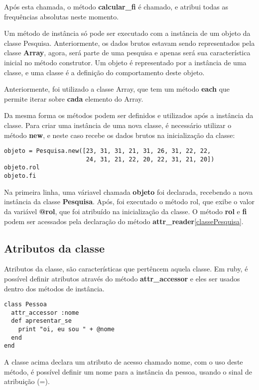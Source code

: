 \documentclass[12pt]{article}
\newcommand{\code}[1] {\textbf{#1}}
\begin{document}
Após esta chamada, o método \code{calcular\_fi} é chamado, e atribui todas as frequências absolutas neste momento. 

Um método de instância só pode ser executado com a instância de um objeto da classe Pesquisa. Anteriormente, os dados brutos estavam sendo representados pela classe \code{Array}, agora, será parte de uma pesquisa e apenas será sua característica inicial no método construtor. Um objeto é representado por a instância de uma classe, e uma classe é a definição do comportamento deste objeto.

Anteriormente, foi utilizado a classe Array, que tem um método \code{each} que permite iterar sobre \code{cada} elemento do Array. 

Da mesma forma os métodos podem ser definidos e utilizados após a instância da classe. Para criar uma instância de uma nova classe, é necessário utilizar o método \code{new}, e neste caso recebe os dados brutos na inicialização da classe:

\begin{lstlisting}[caption=Criando uma classe]
objeto = Pesquisa.new([23, 31, 31, 21, 31, 26, 31, 22, 22, 
                       24, 31, 21, 22, 20, 22, 31, 21, 20])
objeto.rol
objeto.fi
\end{lstlisting}

Na primeira linha, uma váriavel chamada \code{objeto} foi declarada, recebendo a nova instância da classe \code{Pesquisa}. Após, foi executado o método rol, que exibe o valor da variável \code{@rol}, que foi atribuído na inicialização da classe. O método \code{rol} e \code{fi} podem ser acessados pela declaração do método \code{attr\_reader}\ref{classePesquisa}. 

\subsection{ Atributos da classe }

Atributos da classe, são características que pertêncem aquela classe. Em ruby, é possível definir atributos através do método \code{attr\_accessor} e eles ser usados dentro dos métodos de instância.

\begin{lstlisting}[caption=Criando uma classe com atributos]
class Pessoa
  attr_accessor :nome
  def apresentar_se 
    print "oi, eu sou " + @nome
  end
end
\end{lstlisting}

A classe acima declara um atributo de acesso chamado nome, com o uso deste método, é possível definir um nome para a instância da pessoa, usando o sinal de atribuição (=).
\end{document}
